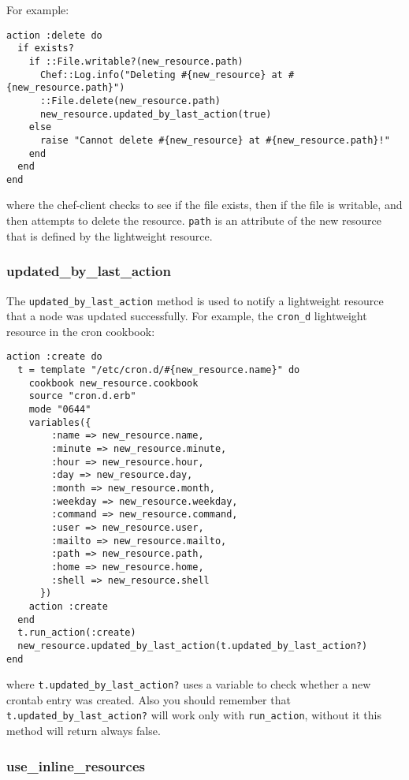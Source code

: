 For example:

\begin{lstlisting}[label=lst:cookbook-lwrp-dsl-new-resource]
action :delete do
  if exists?
    if ::File.writable?(new_resource.path)
      Chef::Log.info("Deleting #{new_resource} at #{new_resource.path}")
      ::File.delete(new_resource.path)
      new_resource.updated_by_last_action(true)
    else
      raise "Cannot delete #{new_resource} at #{new_resource.path}!"
    end
  end
end
\end{lstlisting}

where the chef-client checks to see if the file exists, then if the file is writable, and then attempts to delete the resource. \lstinline!path! is an attribute of the new resource that is defined by the lightweight resource.

\subsubsection{updated\_by\_last\_action}

The \lstinline!updated_by_last_action! method is used to notify a lightweight resource that a node was updated successfully. For example, the \lstinline!cron_d! lightweight resource in the cron cookbook:

\begin{lstlisting}[label=lst:cookbook-lwrp-dsl-updated]
action :create do
  t = template "/etc/cron.d/#{new_resource.name}" do
    cookbook new_resource.cookbook
    source "cron.d.erb"
    mode "0644"
    variables({
        :name => new_resource.name,
        :minute => new_resource.minute,
        :hour => new_resource.hour,
        :day => new_resource.day,
        :month => new_resource.month,
        :weekday => new_resource.weekday,
        :command => new_resource.command,
        :user => new_resource.user,
        :mailto => new_resource.mailto,
        :path => new_resource.path,
        :home => new_resource.home,
        :shell => new_resource.shell
      })
    action :create
  end
  t.run_action(:create)
  new_resource.updated_by_last_action(t.updated_by_last_action?)
end
\end{lstlisting}

where \lstinline!t.updated_by_last_action?! uses a variable to check whether a new crontab entry was created. Also you should remember that \lstinline!t.updated_by_last_action?! will work only with \lstinline!run_action!, without it this method will return always false.

\subsubsection{use\_inline\_resources}

